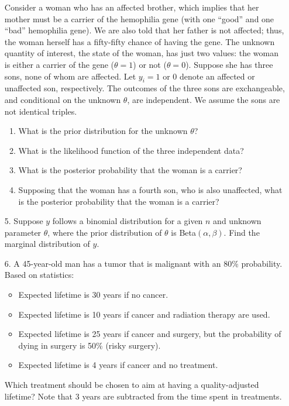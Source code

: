 \documentclass[12pt,a4paper,twoside]{article}
\begin{document}
\begin{enumerate}
    Consider a woman who has an affected brother, which implies that her mother must be a carrier of the hemophilia gene
    (with one “good” and one “bad” hemophilia gene). We are also told that her father is not affected; thus, the woman herself
    has a fifty-fifty chance of having the gene. The unknown quantity of interest, the state of the woman, has just two values:
    the woman is either a carrier of the gene ($\theta = 1$) or not ($\theta = 0$). Suppose she has three sons, none of whom are
    affected. Let $y_i = 1$ or $0$ denote an affected or unaffected son, respectively. The outcomes of the three sons are
    exchangeable, and conditional on the unknown $\theta$, are independent. We assume the sons are not identical triples.
    \begin{enumerate}[label=\textbf{4\alph*)}]
        \item What is the prior distribution for the unknown $\theta$?
        \item What is the likelihood function of the three independent data?
        \item What is the posterior probability that the woman is a carrier?
        \item Supposing that the woman has a fourth son, who is also unaffected, what is the posterior probability that the woman
        is a carrier?
    \end{enumerate}
    \item[5.] Suppose $y$ follows a binomial distribution for a given $n$ and unknown parameter $\theta$, where the prior distribution
    of $\theta$ is Beta$(\alpha, \beta)$. Find the marginal distribution of $y$.
    \item[6.] A 45-year-old man has a tumor that is malignant with an 80\% probability. Based on statistics:
    \begin{itemize}
        \item Expected lifetime is 30 years if no cancer.
        \item Expected lifetime is 10 years if cancer and radiation therapy are used.
        \item Expected lifetime is 25 years if cancer and surgery, but the probability of dying in surgery is 50\% (risky surgery).
        \item Expected lifetime is 4 years if cancer and no treatment.
    \end{itemize}
    Which treatment should be chosen to aim at having a quality-adjusted lifetime? Note that 3 years are subtracted from the time
    spent in treatments.
\end{enumerate}
\end{document}
